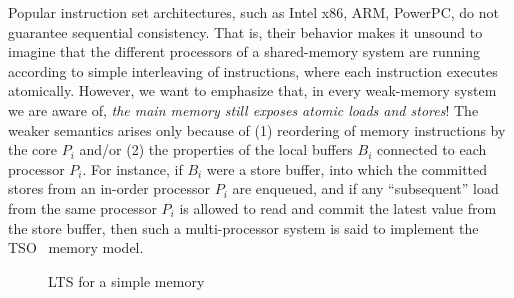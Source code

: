 %
%

Popular instruction set architectures, such as Intel x86, ARM, PowerPC, do not guarantee sequential consistency.  That is, their behavior makes it unsound to imagine that
the different processors of a shared-memory system are running
according to simple interleaving of instructions, where each instruction executes atomically.  However, we want to emphasize that, in every weak-memory system we are aware of, \emph{the main memory still exposes atomic loads and stores}!  The weaker semantics arises only because of (1)
reordering of memory instructions by the core $P_i$ and/or (2) the
properties of the local buffers $B_i$ connected to each processor
$P_i$.  For instance, if $B_i$ were a store buffer, into which the
committed stores from an in-order processor $P_i$ are enqueued, and if
any ``subsequent'' load from the same processor $P_i$ is allowed to read and commit the latest value from the store buffer, then such a multi-processor system is said to implement the TSO~\cite{x86tsocacm10} memory
model. 

\begin{figure}
\small
\centering
\begin{boxedminipage}[c]{.48\textwidth}
\inference
[Ins]
{}
{}

{}

{}

{}%

\end{boxedminipage}
\caption{LTS for a simple memory}
\label{$M_m$}
\end{figure}

